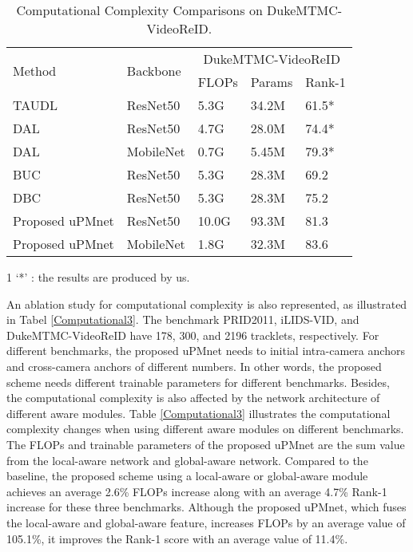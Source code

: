 \documentclass{cta-author}
\begin{document}
	\begin{table}[!h]
		\centering
		\begin{threeparttable}
			\caption{Computational Complexity Comparisons on DukeMTMC-VideoReID.}\label{ComputationalonDuke}
			\begin{tabular}{lllll}
				\hline
				\multirow{2}{*}{Method} & \multirow{2}{*}{Backbone}  & \multicolumn{3}{c}{DukeMTMC-VideoReID} \\
				\cmidrule(r){3-5} 
				& & FLOPs      &  Params & Rank-1 \\ \hline
				TAUDL \cite{RN369} & ResNet50   & 5.3G  & 34.2M& 61.5*\\
				DAL \cite{RN87}    & ResNet50   & 4.7G  & 28.0M& 74.4*\\
				DAL \cite{RN87}    & MobileNet  & 0.7G  & 5.45M& 79.3*\\
				BUC \cite{RN247}   & ResNet50   & 5.3G  & 28.3M& 69.2 \\
				DBC \cite{RN118}   & ResNet50   & 5.3G  & 28.3M& 75.2 \\ \hline
				Proposed uPMnet    & ResNet50   & 10.0G & 93.3M& 81.3 \\
				Proposed uPMnet    & MobileNet  & 1.8G  & 32.3M& 83.6 \\ \hline
			\end{tabular}
			\begin{tablenotes}
				\item[1] `*' : the results are produced by us.
			\end{tablenotes}
		\end{threeparttable}
	\end{table}
	
	An ablation study for computational complexity is also represented, as illustrated in Tabel \ref{Computational3}. The benchmark PRID2011, iLIDS-VID, and DukeMTMC-VideoReID have 178, 300, and 2196 tracklets, respectively. For different benchmarks, the proposed uPMnet needs to initial intra-camera anchors  and cross-camera anchors  of different numbers. In other words, the proposed scheme needs different trainable parameters for different benchmarks. Besides, the computational complexity is also affected by the network architecture of different aware modules. Table \ref{Computational3} illustrates the computational complexity changes when using different aware modules on different benchmarks. The FLOPs and trainable parameters of the proposed uPMnet are the sum value from the local-aware network and global-aware network. Compared to the baseline, the proposed scheme using a local-aware or global-aware module achieves an average 2.6\% FLOPs increase along with an average 4.7\% Rank-1 increase for these three benchmarks. Although the proposed uPMnet, which fuses the local-aware and global-aware feature, increases FLOPs by an average value of 105.1\%, it improves the Rank-1 score with an average value of 11.4\%.
\end{document}
